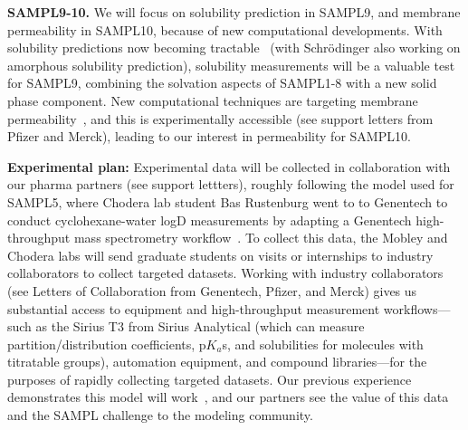 \documentclass[11pt]{article}
\begin{document}
{\bf SAMPL9-10.}
We will focus on solubility prediction in SAMPL9, and membrane permeability in SAMPL10, because of new computational developments.
With solubility predictions now becoming tractable~\cite{Schnieders:2012:J.Chem.TheoryComput., park_absolute_2014, liu_using_2016} (with Schr\"{o}dinger also working on amorphous solubility prediction), solubility measurements will be a valuable test for SAMPL9, combining the solvation aspects of SAMPL1-8 with a new solid phase component.
New computational techniques are targeting membrane permeability~\cite{lee_permeability_2016, comer_permeability_2014}, and this is experimentally accessible (see support letters from Pfizer and Merck), leading to our interest in permeability for SAMPL10.
  
{\bf Experimental plan:}
Experimental data will be collected in collaboration with our pharma partners (see support lettters), roughly following the model used for SAMPL5, where Chodera lab student Bas Rustenburg went to to Genentech to conduct cyclohexane-water logD measurements by adapting a Genentech high-throughput mass spectrometry workflow~\cite{rustenburg_measuring_2016}.
To collect this data, the Mobley and Chodera labs will send graduate students on visits or internships to industry collaborators to collect targeted datasets.
Working with industry collaborators (see Letters of Collaboration from Genentech, Pfizer, and Merck) gives us substantial access to equipment and high-throughput measurement workflows---such as the Sirius T3 from Sirius Analytical (which can measure partition/distribution coefficients, p$K_a$s, and solubilities for molecules with titratable groups), automation equipment, and compound libraries---for the purposes of rapidly collecting targeted datasets.
Our previous experience demonstrates this model will work~\cite{rustenburg_measuring_2016}, and our partners see the value of this data and the SAMPL challenge to the modeling community.
\end{document}
